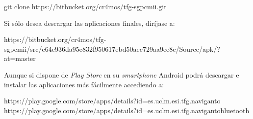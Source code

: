 \begin{listing}[
  float=ht,
  language = Bash]
git clone https://bitbucket.org/cr4mos/tfg-sgpcmii.git
\end{listing}

Si sólo desea descargar las aplicaciones finales, diríjase a:

\begin{listing}
https://bitbucket.org/cr4mos/tfg-sgpcmii/src/e64e936da95e832f950617ebd50aec729aa9ee8c/Source/apk/?at=master
\end{listing}

Aunque si dispone de \emph{Play Store} en su \emph{smartphone} Android podrá descargar e instalar
las aplicaciones más fácilmente accediendo a:

\begin{listing}
https://play.google.com/store/apps/details?id=es.uclm.esi.tfg.naviganto
https://play.google.com/store/apps/details?id=es.uclm.esi.tfg.navigantobluetooth
\end{listing}


